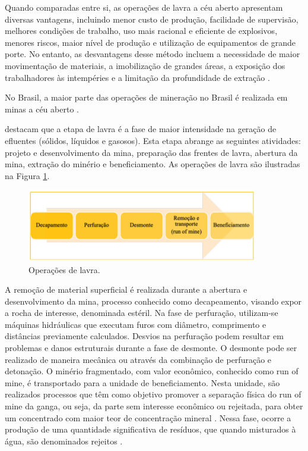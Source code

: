 Quando comparadas entre si, as operações de lavra a céu aberto
apresentam diversas vantagens, incluindo menor custo de produção,
facilidade de supervisão, melhores condições de trabalho, uso mais
racional e eficiente de explosivos, menores riscos, maior nível de
produção e utilização de equipamentos de grande porte. No entanto, as
desvantagens desse método incluem a necessidade de maior movimentação de
materiais, a imobilização de grandes áreas, a exposição dos
trabalhadores às intempéries e a limitação da profundidade de extração
\cite{freire2020rejeitos}.

No Brasil, a maior parte das operações de mineração no Brasil é
realizada em minas a céu aberto \cite[p.343]{carvalho2018sustentabilidade}.

\cite{carvalho2018sustentabilidade} destacam que a etapa de lavra é a fase de maior
intensidade na geração de efluentes (sólidos, líquidos e gasosos). Esta
etapa abrange as seguintes atividades: projeto e desenvolvimento da
mina, preparação das frentes de lavra, abertura da mina, extração do
minério e beneficiamento. As operações de lavra são ilustradas na Figura \ref{fig:operacoes_lavra}.

\begin{figure}[!htb]
    \centering
    \includegraphics[width=0.9\textwidth]{figures/image16_operacoes_lavra.png}
    \caption{Operações de lavra.}
    \label{fig:operacoes_lavra}
\end{figure}

A remoção de material superficial é realizada durante a abertura e
desenvolvimento da mina, processo conhecido como decapeamento, visando
expor a rocha de interesse, denominada estéril. Na fase de perfuração,
utilizam-se máquinas hidráulicas que executam furos com diâmetro,
comprimento e distâncias previamente calculados. Desvios na perfuração
podem resultar em problemas e danos estruturais durante a fase de
desmonte. O desmonte pode ser realizado de maneira mecânica ou através
da combinação de perfuração e detonação. O minério fragmentado, com
valor econômico, conhecido como run of mine, é transportado para a
unidade de beneficiamento. Nesta unidade, são realizados processos que
têm como objetivo promover a separação física do run of mine da ganga,
ou seja, da parte sem interesse econômico ou rejeitada, para obter um
concentrado com maior teor de concentração mineral \cite[p.345-346]{carvalho2018sustentabilidade}. Nessa fase, ocorre a produção de uma quantidade
significativa de resíduos, que quando misturados à água, são denominados
rejeitos \cite[apud][]{freire2020rejeitos}.

